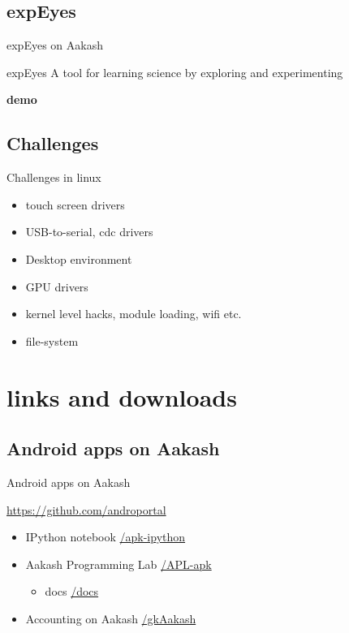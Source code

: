 \documentclass{beamer}
\begin{document}
\subsection{expEyes}
\begin{frame}{expEyes on Aakash}
  \begin{block}{expEyes}
    A tool for learning science by exploring and experimenting
  \end{block}
  \vskip 1cm
  \centerline {\bf demo}
\end{frame}

 \subsection{Challenges}
  \begin{frame}{Challenges in linux}
    \begin{block}{}
      \begin{itemize}
        \item touch screen drivers
        \item USB-to-serial, cdc drivers
        \item Desktop environment
        \item GPU drivers
        \item kernel level hacks, module loading, wifi etc.
        \item file-system
      \end{itemize}
    \end{block}
    \end{frame}
  
  \section{links and downloads}
  \subsection{Android apps on Aakash}
  \begin{frame}{Android apps on Aakash}
    \begin{block}{\url{https://github.com/androportal}}
      \begin{itemize}
      \item IPython notebook \hfill \url{/apk-ipython}
      \item Aakash Programming Lab \hfill \url{/APL-apk}
        \begin{itemize}
        \item docs \hfill \url{/docs}
        \end{itemize}
      \item Accounting on Aakash \hfill \url{/gkAakash}
      \end{itemize}
    \end{block}
  \end{frame}
\end{document}
